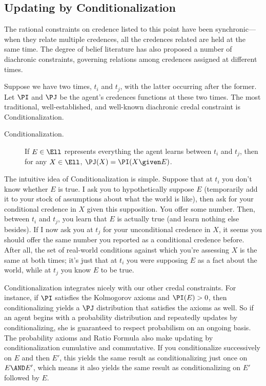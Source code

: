 \subsection{Updating by Conditionalization} \label{ss:Cond}
The rational constraints on credence listed to this point have been synchronic---when they relate multiple credences, all the credences related are held at the same time. The degree of belief literature has also proposed a number of diachronic constraints, governing relations among credences assigned at different times.

Suppose we have two times, $t_i$ and $t_j$, with the latter occurring after the former. Let $\PI$ and $\PJ$ be the agent's credences functions at these two times. The most traditional, well-established, and well-known diachronic credal constraint is Conditionalization.
\begin{description}
\item[Conditionalization.\,]{If $E \in \Ell$ represents everything the agent learns between $t_i$ and $t_j$, then for any $X \in \Ell$, $\PJ(X)=\PI(X \given E)$.}
\end{description}
The intuitive idea of Conditionalization is simple. Suppose that at $t_i$ you don't know whether $E$ is true. I ask you to hypothetically suppose $E$ (temporarily add it to your stock of assumptions about what the world is like), then ask for your conditional credence in $X$ given this supposition. You offer some number. Then, between $t_i$ and $t_j$, you learn that $E$ is actually true (and learn nothing else besides). If I now ask you at $t_j$ for your unconditional credence in $X$, it seems you should offer the same number you reported as a conditional credence before. After all, the set of real-world conditions against which you're assessing $X$ is the same at both times; it's just that at $t_i$ you were supposing $E$ as a fact about the world, while at $t_j$ you know $E$ to be true.

Conditionalization integrates nicely with our other credal constraints. For instance, if $\PI$ satisfies the Kolmogorov axioms and $\PI(E)>0$, then conditionalizing yields a $\PJ$ distribution that satisfies the axioms as well. So if an agent begins with a probability distribution and repeatedly updates by conditionalizing, she is guaranteed to respect probabilism on an ongoing basis. The probability axioms and Ratio Formula also make updating by conditionalization cumulative and commutative. If you conditionalize successively on $E$ and then $E'$, this yields the same result as conditionalizing just once on $E \AND E'$, which means it also yields the same result as conditionalizing on $E'$ followed by $E$.      

